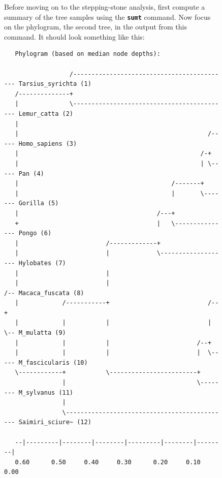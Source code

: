 \documentclass[12pt]{book}
\newcommand{\ttt}[1]{\texttt{#1}}
\newcommand{\tb}[1]{\ttt{\textbf{#1}}}
\begin{document}
\begin{figure}[h]
Before moving on to the stepping-stone analysis, first compute a summary of the tree samples using
the \tb{sumt} command. Now focus on the phylogram, the second tree, in the output from this
command. It should look something like this:

\begin{singlespacing}
\scriptsize
\begin{verbatim}
   Phylogram (based on median node depths):

                  /------------------------------------------- Tarsius_syrichta (1)
   /--------------+                                                                
   |              \------------------------------------------- Lemur_catta (2)
   |                                                                               
   |                                                    /----- Homo_sapiens (3)
   |                                                  /-+                          
   |                                                  | \----- Pan (4)
   |                                          /-------+                            
   |                                          |       \------- Gorilla (5)
   |                                      /---+                                    
   +                                      |   \--------------- Pongo (6)
   |                        /-------------+                                        
   |                        |             \------------------- Hylobates (7)
   |                        |                                                      
   |                        |                              /-- Macaca_fuscata (8)
   |            /-----------+                           /--+                       
   |            |           |                           |  \-- M_mulatta (9)
   |            |           |                        /--+                          
   |            |           |                        |  \----- M_fascicularis (10)
   \------------+           \------------------------+                             
                |                                    \-------- M_sylvanus (11)
                |                                                                  
                \--------------------------------------------- Saimiri_sciure~ (12)
                                                                                   
   --|---------|--------|--------|---------|--------|--------|                     
   0.60      0.50     0.40     0.30      0.20     0.10     0.00                    


\end{verbatim}
\end{singlespacing}
\end{figure}
\end{document}
